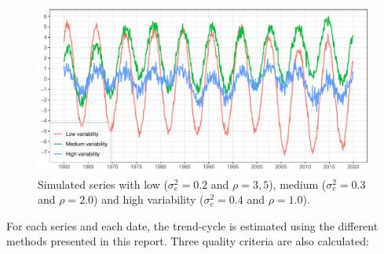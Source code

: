 \documentclass[
]{article}
\newcommand\1{\mathds{1}}
\begin{document}
\begin{figure}[H]

\caption{\label{fig-graphs-data-simul}Simulated series with low
(\(\sigma_e^2=0.2\) and \(\rho = 3,5\)), medium (\(\sigma_e^2=0.3\) and
\(\rho = 2.0\)) and high variability (\(\sigma_e^2=0.4\) and
\(\rho = 1.0\)).}

{\centering \includegraphics[width=1\textwidth,height=\textheight]{img/simulations/simul_data.pdf}

}

\end{figure}

For each series and each date, the trend-cycle is estimated using the
different methods presented in this report. Three quality criteria are
also calculated:
\end{document}
